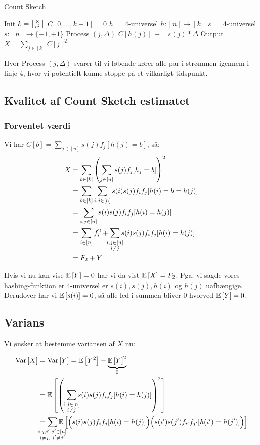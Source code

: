 \begin{algorithm}[H] \caption{Count Sketch} \label{alg:bcs}
  \nonl Init\;
  $k = \left\lceil \frac{8}{\epsilon^2} \right\rceil$\;
  $C[0, \dots, k-1] = 0$\;
  $h =$ 4-universel $h : [n] \rightarrow [k]$\;
  $s =$ 4-universel $s : [n] \rightarrow \{-1, +1 \}$\;
  \nonl Process $(j, \Delta)$\;
  $C[h(j)]$ += $s(j) * \Delta$\;
  \nonl Output\;
  \Return $X = \sum_{j \in [k]} C[j]^2$
\end{algorithm}\vspace{1em}

Hvor Process $(j, \Delta)$ svarer til vi løbende kører alle par i strømmen igennem i linje 4, hvor vi potentielt kunne stoppe på et vilkårligt tidspunkt.

\subsection{Kvalitet af Count Sketch estimatet}

\subsubsection{Forventet værdi}

Vi har $C[b] = \sum_{j \in [n]} s(j) f_j [h(j) = b]$, så:
\begin{align*}
  X
  &= \sum_{b \in [k]} \p{ \sum_{j \in [n]} s(j) f_j [h_j = b] }^2\\
  &= \sum_{b \in [k]} \sum_{i,j \in [n]} s(i) s(j) f_i f_j [h(i) = b = h(j)]\\
  &= \sum_{i,j \in [n]} s(i)s(j) f_i f_j [h(i) = h(j)]\\
  &= \sum_{i \in [n]} f_i^2 + \summ{i,j \in [n]\\ i \neq j} s(i) s(j) f_i f_j [h(i) = h(j)]\\
  &= F_2 + Y
\end{align*}

Hvis vi nu kan vise $\mathbb{E} \left[  Y  \right] = 0$ har vi da vist $\mathbb{E} \left[  X  \right] = F_2$. Pga. vi sagde vores hashing-funktion er 4-universel er $s(i), s(j), h(i)$ og $h(j)$ uafhængige. Derudover har vi $\mathbb{E} \left[  s(i)  \right] = 0$, så alle led i summen bliver 0 hvorved $\mathbb{E} \left[  Y  \right] = 0$.

\subsection{Varians}
Vi ønsker at bestemme variansen af $X$ nu:

\begin{align}
  \Var{X}
  &= \Var{Y} = \E{Y^2} - \underbrace{\E{Y}^2}_{0} \nonumber \\
  &= \E{\p{ \ \summ{i, j \in [n]\\ i \neq j} s(i) s(j) f_i f_j [h(i) = h(j)]  }^2} \nonumber \\
  &= \summ{i, j, i', j' \in [n]\\ i \neq j, \ i' \neq j'} \E{ \pBig{s(i) s(j) f_i f_j [h(i) = h(j)]} \pBig{s(i') s(j') f_{i'} f_{j'} [h(i') = h(j')]  } } \label{eq:monster-sum}
\end{align}

